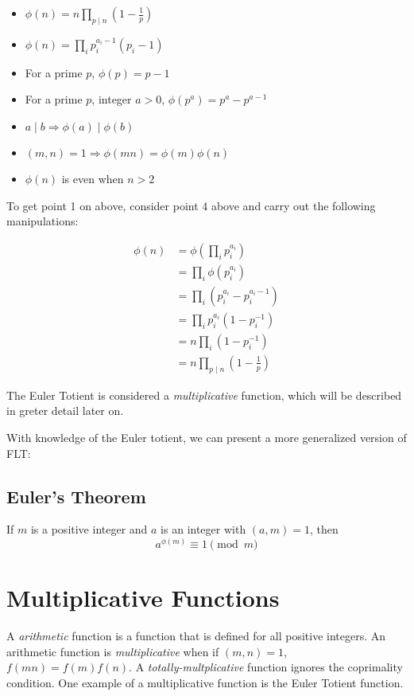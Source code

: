 \documentclass{article}
\begin{document}
\begin{multicols*}{2}
\begin{itemize}
\item $\phi(n) = n \prod_{p \mid n} \left(1 - \frac{1}{p}\right)$
\item $\phi(n) = \prod_{i} p_i^{a_i - 1}(p_i - 1)$
\item For a prime $p$, $\phi(p) = p - 1$
\item For a prime $p$, integer $a > 0$, $\phi(p^a) = p^a - p^{a-1}$
\item $a \mid b \Rightarrow \phi(a) \mid \phi(b)$
\item $(m,n) = 1 \Rightarrow \phi(mn) = \phi(m)\phi(n)$
\item $\phi(n)$ is even when $n > 2$
\end{itemize}

To get point 1 on above, consider point 4 above and carry out the following manipulations:

\[
\begin{aligned}
\phi(n) &= \phi(\prod_{i}p_i^{a_i}) \\
&= \prod_i \phi(p_i^{a_i}) \\
&= \prod_i (p_i^{a_i} - p_i^{a_i - 1}) \\
&= \prod_i p_i^{a_i}( 1 - p_i^{-1}) \\
&= n \prod_i ( 1 - p_i^{-1}) \\
&= n \prod_{p \mid n} \left(1 - \frac{1}{p}\right)
\end{aligned}
\]

The Euler Totient is considered a \textit{multiplicative} function, which will be described in greter detail later on.

With knowledge of the Euler totient, we can present a more generalized version of FLT:

\subsection*{Euler's Theorem}

If $m$ is a positive integer and $a$ is an integer with $(a,m) = 1$, then \[a^{\phi(m)} \equiv 1 \pmod{m}\]

\section{Multiplicative Functions}

A \textit{arithmetic} function is a function that is defined for all positive integers. An arithmetic function is \textit{multiplicative} when if $(m,n) = 1$, $f(mn) = f(m)f(n)$. A \textit{totally-multplicative} function ignores the coprimality condition. One example of a multiplicative function is the Euler Totient function.


\end{multicols*}
\end{document}
